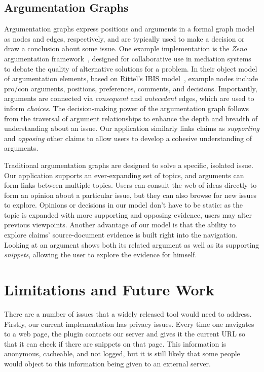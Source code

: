 \documentclass{chi2009}
\begin{document}
%

\subsection{Argumentation Graphs}
Argumentation graphs express positions and arguments in a formal graph model as nodes and edges, respectively, and are typically used to make a decision or draw a conclusion about some issue. One example implementation is the {\it Zeno} argumentation framework~\cite{zeno}, designed for collaborative use in mediation systems to debate the quality of alternative solutions for a problem. In their object model of argumentation elements, based on Rittel's IBIS model~\cite{ibis}, example nodes include pro/con arguments, positions, preferences, comments, and decisions. Importantly, arguments are connected via {\it consequent} and {\it antecedent} edges, which are used to inform {\it choices}. The decision-making power of the argumentation graph follows from the traversal of argument relationships to enhance the depth and breadth of understanding about an issue. Our application similarly links claims as {\it supporting} and {\it opposing} other claims to allow users to develop a cohesive understanding of arguments.

Traditional argumentation graphs are designed to solve a specific, isolated issue. Our application supports an ever-expanding set of topics, and arguments can form links between multiple topics. Users can consult the web of ideas directly to form an opinion about a particular issue, but they can also browse for new issues to explore. Opinions or decisions in our model don't have to be static: as the topic is expanded with more supporting and opposing evidence, users may alter previous viewpoints. Another advantage of our model is that the ability to explore claims' source-document evidence is built right into the navigation. Looking at an argument shows both its related argument as well as its supporting {\it snippets}, allowing the user to explore the evidence for himself. 


\section{Limitations and Future Work}

There are a number of issues that a widely released tool would need to address. Firstly, our current implementation has privacy issues. Every time one navigates to a web page, the plugin contacts our server and gives it the current URL so that it can check if there are snippets on that page. This information is anonymous, cacheable, and not logged, but it is still likely that some people would object to this information being given to an external server. 
\end{document}
